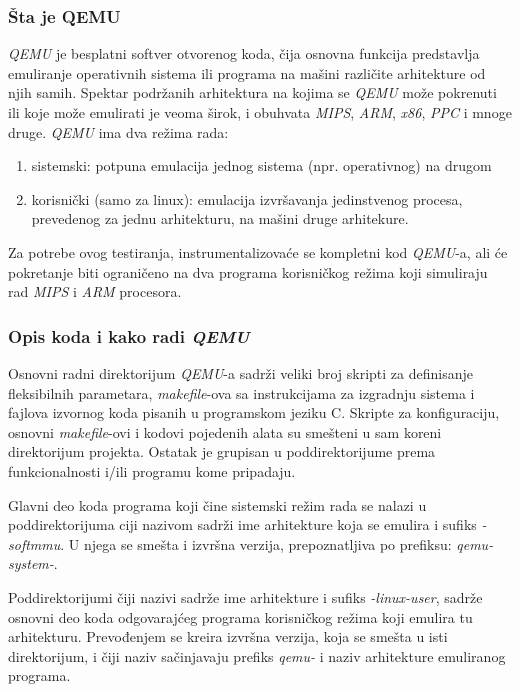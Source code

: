 \documentclass[12pt,oneside]{memoir}
\newcommand{\strano}[1]{\textit{#1}}
\begin{document}
\subsubsection{Šta je QEMU}

\strano{QEMU} \cite{QEMU} je besplatni softver otvorenog koda, čija osnovna funkcija predstavlja emuliranje operativnih sistema ili programa na mašini različite arhitekture od njih samih. Spektar podržanih arhitektura na kojima se \strano{QEMU} može pokrenuti ili koje može emulirati je veoma širok, i obuhvata \strano{MIPS}, \strano{ARM}, \strano{x86}, \strano{PPC} i mnoge druge.
\strano{QEMU} ima dva režima rada:
\begin{enumerate}
\item sistemski: potpuna emulacija jednog sistema (npr. operativnog) na drugom
\item korisnički (samo za linux): emulacija izvršavanja jedinstvenog procesa, prevedenog za jednu arhitekturu, na mašini druge arhitekure.
\end{enumerate}
Za potrebe ovog testiranja, instrumentalizovaće se kompletni kod \strano{QEMU}-a, ali će pokretanje biti ograničeno na dva programa korisničkog režima koji simuliraju rad \strano{MIPS} i \strano{ARM} procesora.

\subsubsection{Opis koda i kako radi \strano{QEMU}}

Osnovni radni direktorijum \strano{QEMU}-a sadrži veliki broj skripti za definisanje fleksibilnih parametara, \strano{makefile}-ova sa instrukcijama za izgradnju sistema i fajlova izvornog koda pisanih u programskom jeziku C. Skripte za konfiguraciju, osnovni \strano{makefile}-ovi i kodovi pojedenih alata su smešteni u sam koreni direktorijum projekta. Ostatak je grupisan u poddirektorijume prema funkcionalnosti i/ili programu kome pripadaju.

Glavni deo koda programa koji čine sistemski režim rada se nalazi u poddirektorijuma ciji nazivom sadrži ime arhitekture koja se emulira i sufiks \strano{-softmmu}. U njega se smešta i izvršna verzija, prepoznatljiva po prefiksu: \strano{qemu-system-}.

Poddirektorijumi čiji nazivi sadrže ime arhitekture i sufiks \strano{-linux-user}, sadrže osnovni deo koda odgovarajćeg programa korisničkog režima koji emulira tu arhitekturu. Prevođenjem se kreira izvršna verzija, koja se smešta u isti direktorijum, i čiji naziv sačinjavaju prefiks \strano{qemu-} i naziv arhitekture emuliranog programa.
\end{document}
